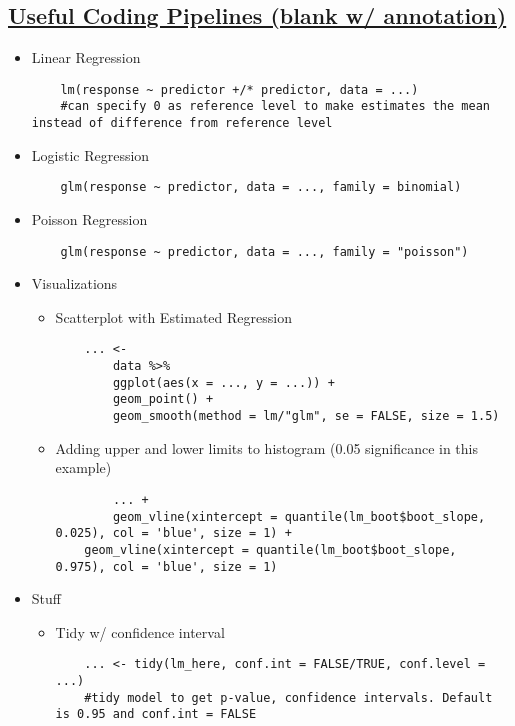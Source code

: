\documentclass[8pt,landscape,a4paper, fleqn, dvipsnames]{extarticle}
\begin{document}
\begin{multicols*}{4}

\section*{\ul{Useful Coding Pipelines (blank w/ annotation)}}
\begin{itemize}
\item Linear Regression
\begin{lstlisting}
    lm(response ~ predictor +/* predictor, data = ...) 
    #can specify 0 as reference level to make estimates the mean instead of difference from reference level
\end{lstlisting}
\item Logistic Regression
\begin{lstlisting}
    glm(response ~ predictor, data = ..., family = binomial)
\end{lstlisting}
\item Poisson Regression
\begin{lstlisting}
    glm(response ~ predictor, data = ..., family = "poisson")
\end{lstlisting}
\item Visualizations
\begin{itemize}
    \item Scatterplot with Estimated Regression
    \begin{lstlisting}
    ... <- 
        data %>%
        ggplot(aes(x = ..., y = ...)) +
        geom_point() +
        geom_smooth(method = lm/"glm", se = FALSE, size = 1.5)
    \end{lstlisting}
    \item Adding upper and lower limits to histogram (0.05 significance in this example)
    \begin{lstlisting}
        ... +
        geom_vline(xintercept = quantile(lm_boot$boot_slope, 0.025), col = 'blue', size = 1) +
    geom_vline(xintercept = quantile(lm_boot$boot_slope, 0.975), col = 'blue', size = 1) 
    \end{lstlisting}
    \end{itemize}
    \item Stuff
    \begin{itemize}
        \item Tidy w/ confidence interval
        \begin{lstlisting}
    ... <- tidy(lm_here, conf.int = FALSE/TRUE, conf.level = ...) 
    #tidy model to get p-value, confidence intervals. Default is 0.95 and conf.int = FALSE

\end{lstlisting}
\end{itemize}
\end{itemize}
\end{multicols*}
\end{document}
